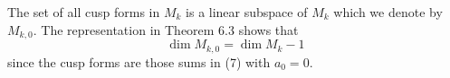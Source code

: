 The set of all cusp forms in $M_k$ is a linear subspace of $M_k$ which we denote by $M_{k,0}$. The representation in Theorem 6.3 shows that
$$
\dim M_{k,0} = \dim M_k - 1
$$
since the cusp forms are those sums in (7) with $a_0 = 0$.
